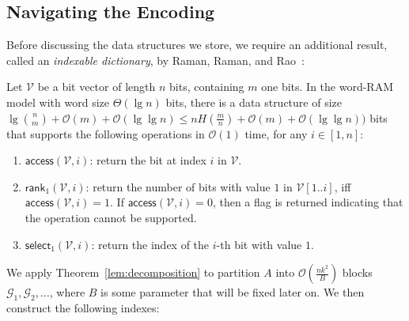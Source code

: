 \documentclass[runningheads]{llncs}
\def\rankop{\textsf{rank}}
\def\selop{\textsf{select}}
\def\accessop{\textsf{access}}
\newcommand{\Oh}{\mathcal{O}}
\begin{document}
\subsection{Navigating the Encoding}

Before discussing the data structures we store, we require an
additional result, called an \emph{indexable dictionary},
by Raman, Raman, and Rao~\cite{RRR07}:

\begin{lemma}\label{lem:rrr-id} Let $\mathcal{V}$ be a
  bit vector of length $n$ bits, containing $m$ one bits.  In the
  word-RAM model with word size $\Theta(\lg n)$ bits, there is a data
  structure of size $\lg \binom{n}{m} + \Oh(m) + \Oh(\lg \lg n) \le n
  H(\frac{m}{n}) + \Oh(m) + \Oh(\lg \lg n))$ bits that supports the
  following operations in $\Oh(1)$ time, for any $i \in [1,n]$:
\begin{enumerate}
\item $\accessop(\mathcal{V}, i)$: return the bit at index $i$ in $\mathcal{V}$.
\item $\rankop_1(\mathcal{V}, i)$: return the number of bits with
  value $1$ in $\mathcal{V}[1..i]$, iff $\accessop(\mathcal{V},i) =
  1$.  If $\accessop(\mathcal{V},i) = 0$, then a flag is returned
  indicating that the operation cannot be supported.
\item $\selop_1(\mathcal{V}, i)$: return the index of the $i$-th
  bit with value $1$.
\end{enumerate}
\end{lemma}


We apply Theorem~\ref{lem:decomposition} to partition $A$ into
$\Oh(\frac{nk^2}{B})$ blocks $\mathcal{G}_{1},\mathcal{G}_{2},\ldots$,
where $B$ is some parameter that will be fixed later on. We then
construct the following indexes:
\end{document}
